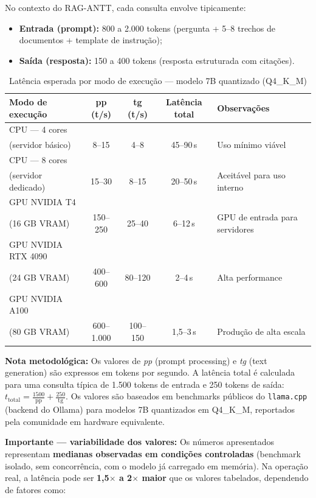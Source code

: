 \documentclass[12pt, a4paper]{article}
\begin{document}
No contexto do RAG-ANTT, cada consulta envolve tipicamente:
\begin{itemize}
  \item \textbf{Entrada (prompt):} 800 a 2.000 tokens (pergunta + 5--8 trechos de documentos + template de instrução);
  \item \textbf{Saída (resposta):} 150 a 400 tokens (resposta estruturada com citações).
\end{itemize}

\begin{table}[H]
\centering
\small
\caption{Latência esperada por modo de execução --- modelo 7B quantizado (Q4\_K\_M)}
\label{tab:latencia}
\begin{tabularx}{\textwidth}{l c c c X}
\toprule
\textbf{Modo de execução} & \textbf{pp (t/s)} & \textbf{tg (t/s)} & \textbf{Latência total} & \textbf{Observações} \\
\midrule
CPU --- 4 cores \\(servidor básico) & 8--15 & 4--8 & 45--90\,s & Uso mínimo viável \\
CPU --- 8 cores \\(servidor dedicado) & 15--30 & 8--15 & 20--50\,s & Aceitável para uso interno \\
GPU NVIDIA T4 \\(16 GB VRAM) & 150--250 & 25--40 & 6--12\,s & GPU de entrada para servidores \\
GPU NVIDIA RTX 4090 \\(24 GB VRAM) & 400--600 & 80--120 & 2--4\,s & Alta performance \\
GPU NVIDIA A100 \\(80 GB VRAM) & 600--1.000 & 100--150 & 1,5--3\,s & Produção de alta escala \\
\bottomrule
\end{tabularx}
\end{table}

\noindent\textbf{Nota metodológica:} Os valores de \textit{pp} (prompt processing) e \textit{tg} (text generation) são expressos em tokens por segundo. A latência total é calculada para uma consulta típica de 1.500 tokens de entrada e 250 tokens de saída: $t_{\text{total}} = \frac{1500}{\text{pp}} + \frac{250}{\text{tg}}$. Os valores são baseados em benchmarks públicos do \texttt{llama.cpp} (backend do Ollama) para modelos 7B quantizados em Q4\_K\_M, reportados pela comunidade em hardware equivalente.

\noindent\textbf{Importante --- variabilidade dos valores:} Os números apresentados representam \textbf{medianas observadas em condições controladas} (benchmark isolado, sem concorrência, com o modelo já carregado em memória). Na operação real, a latência pode ser \textbf{1,5$\times$ a 2$\times$ maior} que os valores tabelados, dependendo de fatores como:
\end{document}
